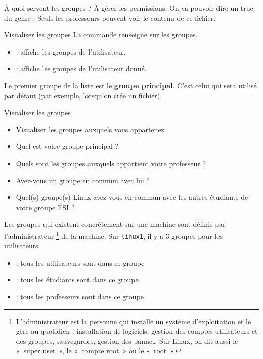 \documentclass[a4paper,11pt]{style-esi/td}
\begin{document}
		À quoi servent les groupes ? 
		À gérer les permissions. 
		On va pouvoir dire un truc du genre : 
		\og{}Seuls les professeurs peuvent voir le contenu de ce fichier\fg{}.

		\begin{theorie}{Visualiser les groupes}
			La commande  renseigne sur les groupes.
			\begin{itemize}
				\item {} : affiche les groupes de l'utilisateur.
				\item {} : affiche les groupes de l'utilisateur donné.
			\end{itemize}
			Le premier groupe de la liste est le \textbf{groupe principal}.
			C'est celui qui sera utilisé par défaut (par exemple, lorsqu'on crée un fichier).
		\end{theorie}

		\begin{Exercice}{Visualiser les groupes}
			\vspace{-1em}
			\begin{itemize}
				\item Visualiser les groupes auxquels vous appartenez.
				\item Quel est votre groupe principal ? 
				\item Quels sont les groupes auxquels appartient votre professeur ?
				\item Avez-vous un groupe en commun avec lui ?
				\item Quel(s) groupe(s) Linux avez-vous en commun avec les autres étudiants de votre groupe ÉSI ?
			\end{itemize}
		\end{Exercice}

		\begin{colxbox}[colback=white,drop fuzzy shadow]
			Les groupes qui existent concrètement sur une machine sont définis 
			par l'administrateur%
			\footnote{
				L'administrateur est la personne qui installe 
				un système d'exploitation et le gère au quotidien : 
				installation de logiciels, 
				gestion des comptes utilisateurs et des groupes, 
				sauvegardes, gestion des panne\dots{}
				Sur Linux, on dit aussi le « super user », 
				le « compte root » ou le « root ».
			} de la machine. 		
			Sur \texttt{linux1}, 
			il y a 3 groupes pour les utilisateurs.
			\begin{itemize}
				\item \textbf{} : tous les utilisateurs sont dans ce groupe
				\item \textbf{} : tous les étudiants sont dans ce groupe
				\item \textbf{} : tous les professeurs sont dans ce groupe	
			\end{itemize}
		\end{colxbox}
\end{document}
